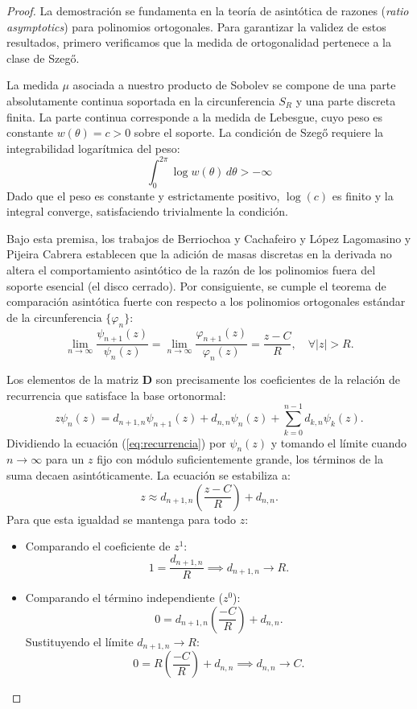 \documentclass[12pt,a4paper]{article}
\begin{document}
\begin{proof}
La demostración se fundamenta en la teoría de asintótica de razones (\textit{ratio asymptotics}) para polinomios ortogonales. Para garantizar la validez de estos resultados, primero verificamos que la medida de ortogonalidad pertenece a la clase de Szegő.

La medida $\mu$ asociada a nuestro producto de Sobolev se compone de una parte absolutamente continua soportada en la circunferencia $S_R$ y una parte discreta finita. La parte continua corresponde a la medida de Lebesgue, cuyo peso es constante $w(\theta) = c > 0$ sobre el soporte. La condición de Szegő requiere la integrabilidad logarítmica del peso:
$$ \int_{0}^{2\pi} \log w(\theta) \, d\theta > -\infty $$
Dado que el peso es constante y estrictamente positivo, $\log(c)$ es finito y la integral converge, satisfaciendo trivialmente la condición.

Bajo esta premisa, los trabajos de Berriochoa y Cachafeiro \cite{berriochoa2000bernstein} y López Lagomasino y Pijeira Cabrera \cite{lopez1999zero} establecen que la adición de masas discretas en la derivada no altera el comportamiento asintótico de la razón de los polinomios fuera del soporte esencial (el disco cerrado). Por consiguiente, se cumple el teorema de comparación asintótica fuerte con respecto a los polinomios ortogonales estándar de la circunferencia $\{\varphi_n\}$:
\begin{equation}
    \lim_{n \to \infty} \frac{\psi_{n+1}(z)}{\psi_n(z)} = \lim_{n \to \infty} \frac{\varphi_{n+1}(z)}{\varphi_n(z)} = \frac{z - C}{R}, \quad \forall |z| > R.
\end{equation}

Los elementos de la matriz $\mathbf{D}$ son precisamente los coeficientes de la relación de recurrencia que satisface la base ortonormal:
\begin{equation} \label{eq:recurrencia}
    z \psi_n(z) = d_{n+1, n} \psi_{n+1}(z) + d_{n, n} \psi_n(z) + \sum_{k=0}^{n-1} d_{k, n} \psi_k(z).
\end{equation}
Dividiendo la ecuación (\ref{eq:recurrencia}) por $\psi_n(z)$ y tomando el límite cuando $n \to \infty$ para un $z$ fijo con módulo suficientemente grande, los términos de la suma decaen asintóticamente. La ecuación se estabiliza a:
$$ z \approx d_{n+1, n} \left( \frac{z - C}{R} \right) + d_{n, n}. $$
Para que esta igualdad se mantenga para todo $z$:
\begin{itemize}
    \item Comparando el coeficiente de $z^1$:
    $$ 1 = \frac{d_{n+1, n}}{R} \implies d_{n+1, n} \to R. $$
    \item Comparando el término independiente ($z^0$):
    $$ 0 = d_{n+1, n} \left( \frac{-C}{R} \right) + d_{n, n}. $$
    Sustituyendo el límite $d_{n+1, n} \to R$:
    $$ 0 = R \left( \frac{-C}{R} \right) + d_{n, n} \implies d_{n, n} \to C. $$
\end{itemize}
\end{proof}
\end{document}
